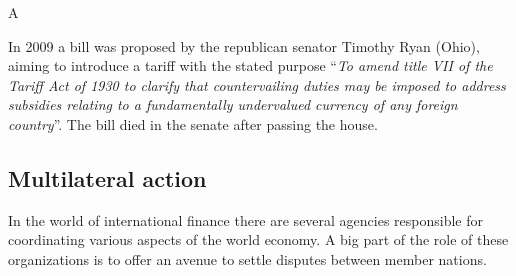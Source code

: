 A




In 2009 a bill was proposed by the republican senator Timothy Ryan 
(Ohio), aiming to introduce a tariff with the stated purpose 
``\textit{To amend title VII of the Tariff Act of 1930 to clarify that 
	countervailing duties may be imposed to address subsidies relating 
	to a fundamentally undervalued currency of any foreign 
country}''\cite{Ryan2009}. The bill died in the senate after passing the 
house.





\subsection{Multilateral action}

In the world of international finance there are several agencies 
responsible for coordinating various aspects of the world economy. A big 
part of the role of these organizations is to offer an avenue to settle 
disputes between member nations. %

